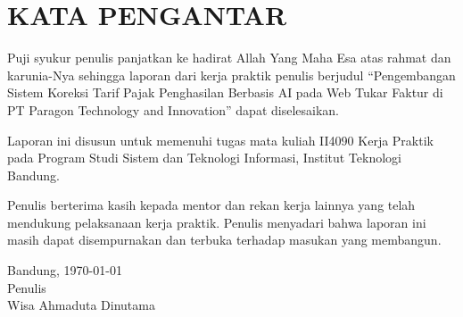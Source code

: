 \chapter*{KATA PENGANTAR}

Puji syukur penulis panjatkan ke hadirat Allah Yang Maha Esa atas rahmat dan karunia-Nya sehingga laporan dari kerja praktik penulis berjudul ``Pengembangan Sistem Koreksi Tarif Pajak Penghasilan Berbasis AI pada Web Tukar Faktur di PT Paragon Technology and Innovation'' dapat diselesaikan.

Laporan ini disusun untuk memenuhi tugas mata kuliah II4090 Kerja Praktik pada Program Studi Sistem dan Teknologi Informasi, Institut Teknologi Bandung.

Penulis berterima kasih kepada mentor dan rekan kerja lainnya yang telah mendukung pelaksanaan kerja praktik. Penulis menyadari bahwa laporan ini masih dapat disempurnakan dan terbuka terhadap masukan yang membangun.
\begin{flushright}
    Bandung, \today\\
    
    Penulis \\
    \vspace{1cm}
    Wisa Ahmaduta Dinutama
\end{flushright}
